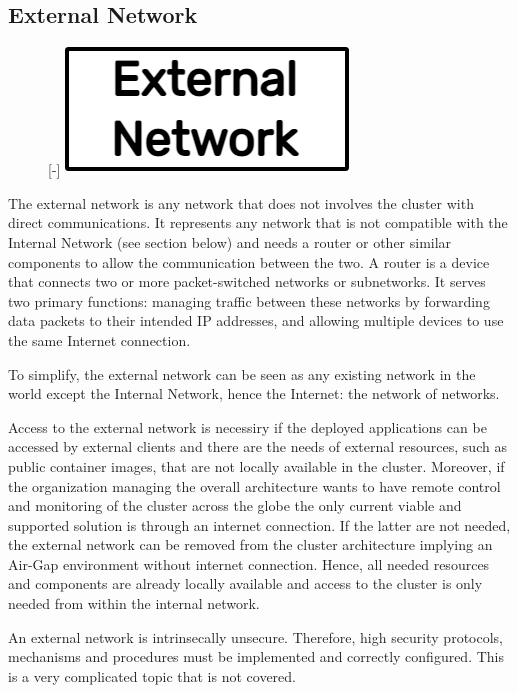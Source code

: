 \subsection{External Network}
\label{subsec:architecture_network_external_network}

\begin{figure} %
  \raisebox{0pt}[\dimexpr\height-\baselineskip\relax]{\centering
  \includegraphics[width=.2\textwidth]{images/recluster/external_network.png}}
\end{figure}

The external network is any network that does not involves the cluster with direct
communications. It represents any network that is not compatible with the
Internal Network (see section below) and needs a router or other similar
components to allow the communication between the two. A router is a device that
connects two or more packet-switched networks or subnetworks. It serves two
primary functions: managing traffic between these networks by forwarding data packets
to their intended IP addresses, and allowing multiple devices to use the same
Internet connection\cite{https://www.cloudflare.com/learning/network-layer/what-is-a-router}.

To simplify, the external network can be seen as any existing network in the
world except the Internal Network, hence the Internet: the network of networks.

Access to the external network is necessiry if the deployed applications can be
accessed by external clients and there are the needs of external resources, such
as public container images, that are not locally available in the cluster. Moreover,
if the organization managing the overall architecture wants to have remote
control and monitoring of the cluster across the globe the only current viable
and supported solution is through an internet connection. If the latter are not needed,
the external network can be removed from the cluster architecture implying an
Air-Gap environment without internet connection. Hence, all needed resources and
components are already locally available and access to the cluster is only
needed from within the internal network.

An external network is intrinsecally unsecure. Therefore, high security
protocols, mechanisms and procedures must be implemented and correctly configured.
This is a very complicated topic that is not covered.

